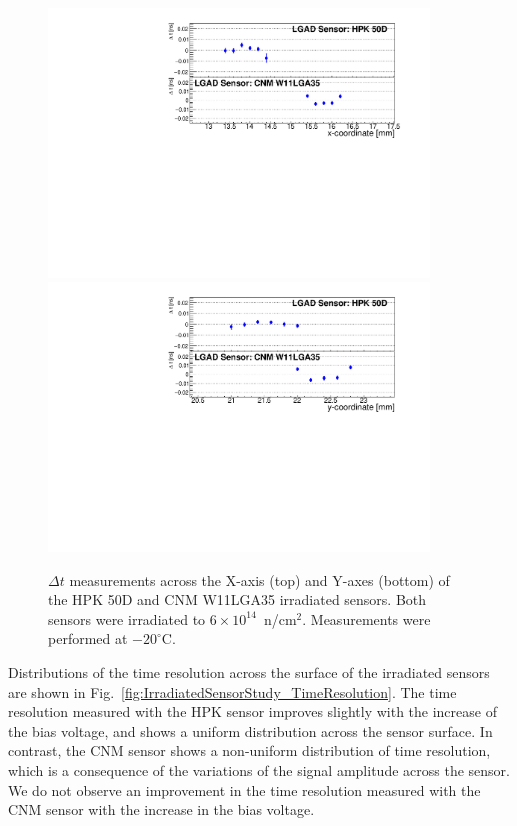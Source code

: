 \documentclass[preprint,1p]{elsarticle}
\begin{document}
\begin{figure}[htbp] 
\centering
\includegraphics[width=0.9\textwidth]{figs/USCSBoard_HPK50DIrradiated-CNMW11LGA35_Run936-961/IrradiatedSensorStudy_MeanTime_vs_X.pdf} 
\includegraphics[width=0.9\textwidth]{figs/USCSBoard_HPK50DIrradiated-CNMW11LGA35_Run936-961/IrradiatedSensorStudy_MeanTime_vs_Y.pdf} 
\caption{$\Delta{t}$ measurements across the X-axis (top) and Y-axes (bottom) of the HPK 50D and CNM W11LGA35 irradiated sensors. Both sensors were irradiated to $6\times 10^{14}$~n/cm$^2$. Measurements were performed at $-20^{\circ}$C.} 
\label{fig:IrradiatedSensorStudy_MeanTime} 
\end{figure} 

Distributions of the time resolution across the surface of the irradiated
sensors are shown in Fig.~\ref{fig:IrradiatedSensorStudy_TimeResolution}. The time
resolution measured with the HPK sensor improves slightly with the increase of
the bias voltage, and shows a uniform distribution across the sensor surface. In
contrast, the CNM sensor shows a non-uniform distribution of time resolution,
which is a consequence of the variations of the signal amplitude across the
sensor. We do not observe an improvement in the time resolution measured with
the CNM sensor with the increase in the bias voltage.
\end{document}
